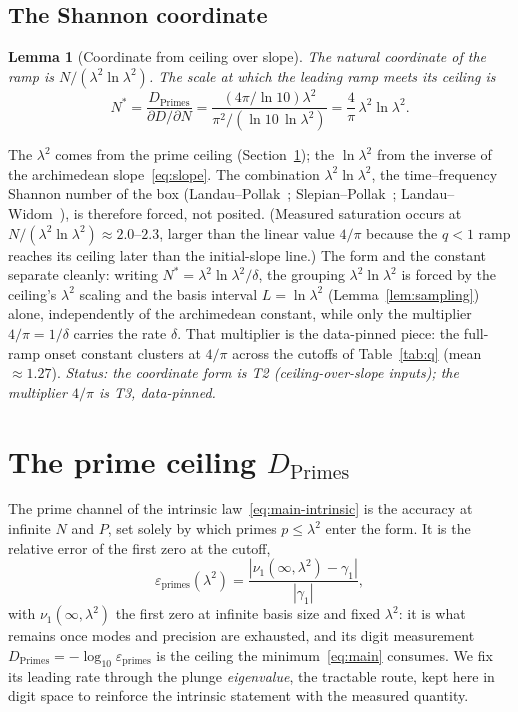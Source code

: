 \documentclass[11pt,a4paper]{article}
\newtheorem{lemma}{Lemma}
\begin{document}
\subsection{The Shannon coordinate}\label{ssec:coord}

\begin{lemma}[Coordinate from ceiling over slope]\label{lem:coord}
The natural coordinate of the ramp is $N/(\lambda^2\ln\lambda^2)$. The scale at
which the leading ramp meets its ceiling is
\[
  N^\ast=\frac{D_{\mathrm{Primes}}}{\partial D/\partial N}
  =\frac{(4\pi/\ln10)\lambda^2}{\pi^2/(\ln10\,\ln\lambda^2)}
  =\frac{4}{\pi}\,\lambda^2\ln\lambda^2 .
\]
\end{lemma}

The $\lambda^2$ comes from the prime ceiling (Section~\ref{sec:primes}); the
$\ln\lambda^2$ from the inverse of the archimedean slope~\eqref{eq:slope}.
The combination $\lambda^2\ln\lambda^2$, the time--frequency Shannon number
of the box (Landau--Pollak~\cite{LandauPollak1962};
Slepian--Pollak~\cite{SlepianPollak1961}; Landau--Widom~\cite{LandauWidom1980}),
is therefore forced, not posited. (Measured saturation occurs at
$N/(\lambda^2\ln\lambda^2)\approx2.0$--$2.3$, larger than the linear value
$4/\pi$ because the $q<1$ ramp reaches its ceiling later than the initial-slope
line.) The form and the constant separate cleanly: writing
$N^\ast=\lambda^2\ln\lambda^2/\delta$, the grouping $\lambda^2\ln\lambda^2$ is
forced by the ceiling's $\lambda^2$ scaling and the basis interval
$L=\ln\lambda^2$ (Lemma~\ref{lem:sampling}) alone, independently of the archimedean constant, while
only the multiplier $4/\pi=1/\delta$ carries the rate $\delta$. That multiplier
is the data-pinned piece: the full-ramp onset constant clusters at $4/\pi$ across
the cutoffs of Table~\ref{tab:q} (mean $\approx1.27$). \emph{Status: the
coordinate form is T2 (ceiling-over-slope inputs); the multiplier $4/\pi$ is T3,
data-pinned.}

\section{The prime ceiling $D_{\mathrm{Primes}}$}\label{sec:primes}

The prime channel of the intrinsic law~\eqref{eq:main-intrinsic} is the accuracy
at infinite $N$ and $P$, set solely by which primes $p\le\lambda^2$ enter the
form. It is the relative error of the first zero at the cutoff,
\begin{equation}\label{eq:epsprimes}
  \varepsilon_{\mathrm{primes}}(\lambda^2)
  =\frac{|\nu_1(\infty,\lambda^2)-\gamma_1|}{|\gamma_1|},
\end{equation}
with $\nu_1(\infty,\lambda^2)$ the first zero at infinite basis size and fixed
$\lambda^2$: it is what remains once modes and precision are exhausted, and its
digit measurement $D_{\mathrm{Primes}}=-\log_{10}\varepsilon_{\mathrm{primes}}$ is
the ceiling the minimum~\eqref{eq:main} consumes. We fix its leading rate through
the plunge \emph{eigenvalue}, the tractable route, kept here in digit space to
reinforce the intrinsic statement with the measured quantity.
\end{document}
